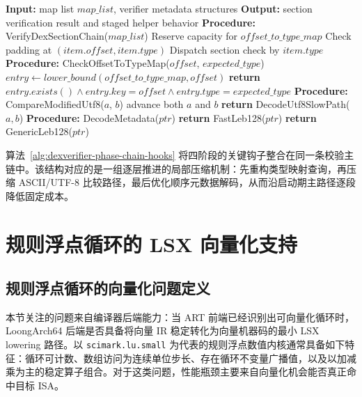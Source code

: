 \begin{algorithm}[H]
    \small
    \caption{DexFileVerifier 阶段链的关键钩子算法}
    \label{alg:dexverifier-phase-chain-hooks}
    \begin{algorithmic}[1]
        \State \textbf{Input:} map list $map\_list$, verifier metadata structures
        \State \textbf{Output:} section verification result and staged helper behavior
        \State \textbf{Procedure:} VerifyDexSectionChain($map\_list$)
        \State Reserve capacity for $offset\_to\_type\_map$
            \State Check padding at $(item.offset, item.type)$
            \State Dispatch section check by $item.type$
        \EndFor
        \State \textbf{Procedure:} CheckOffsetToTypeMap($offset$, $expected\_type$) 
        \State $entry \gets lower\_bound(offset\_to\_type\_map, offset)$
        \State \textbf{return} $entry.exists() \land entry.key = offset \land entry.type = expected\_type$
        \State \textbf{Procedure:} CompareModifiedUtf8($a$, $b$) 
            \State advance both $a$ and $b$
        \EndWhile
        \State \textbf{return} DecodeUtf8SlowPath($a, b$)
        \State \textbf{Procedure:} DecodeMetadata($ptr$) 
            \State \textbf{return} FastLeb128($ptr$)
        \Else
            \State \textbf{return} GenericLeb128($ptr$)
        \EndIf
    \end{algorithmic}
\end{algorithm}

算法~\ref{alg:dexverifier-phase-chain-hooks} 将四阶段的关键钩子整合在同一条校验主链中。该结构对应的是一组逐层推进的局部压缩机制：先重构类型映射查询，再压缩 ASCII/UTF-8 比较路径，最后优化顺序元数据解码，从而沿启动期主路径逐段降低固定成本。

\section{规则浮点循环的 LSX 向量化支持}

\subsection{规则浮点循环的向量化问题定义}

本节关注的问题来自编译器后端能力：当 ART 前端已经识别出可向量化循环时，LoongArch64 后端是否具备将向量 IR 稳定转化为向量机器码的最小 LSX lowering 路径。以 \texttt{scimark.lu.small} 为代表的规则浮点数值内核通常具备如下特征：循环可计数、数组访问为连续单位步长、存在循环不变量广播值，以及以加减乘为主的稳定算子组合。对于这类问题，性能瓶颈主要来自向量化机会能否真正命中目标 ISA。

